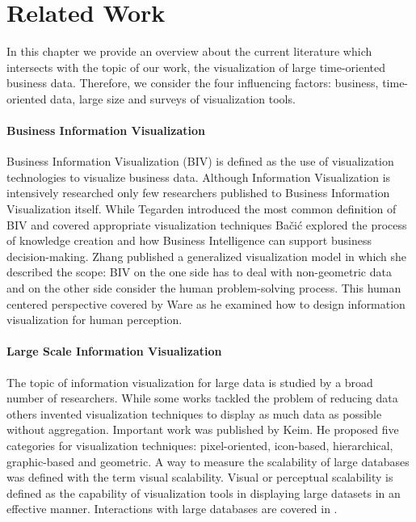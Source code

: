 \chapter{Related Work}
\label{chap:related Work}
In this chapter we provide an overview about the current literature which intersects with the topic of our work, the visualization of large time-oriented business data. Therefore, we consider the four influencing factors: business, time-oriented data, large size and surveys of visualization tools. 

\subsubsection*{Business Information Visualization} 
Business Information Visualization (BIV) is defined as the use of visualization technologies to visualize business data\cite{Tegarden1999}. Although Information Visualization is intensively researched\cite{Shneiderman2008,Shneiderman2002,Shneiderman1996,Keim2002} only few researchers published to Business Information Visualization itself. While Tegarden\cite{Tegarden1999} introduced the most common definition of BIV and covered appropriate visualization techniques Bačić explored the process of knowledge creation\cite{Bacic2012} and how Business Intelligence can support business decision-making\cite{Bacic,Bacic2012}. Zhang\cite{Zhang,Zhang1998,Zhang2001} published a generalized visualization model in which she described the scope: BIV on the one side has to deal with non-geometric data and on the other side consider the human problem-solving process. This human centered perspective covered by Ware\cite{Ware2012a} as he examined how to design information visualization for human perception.

\subsubsection*{Large Scale Information Visualization}
The topic of information visualization for large data is studied by a broad number of researchers. While some works tackled the problem of reducing data others invented visualization techniques to display as much data as possible without aggregation\cite{Krzywinski2009,Luo2012,Fekete2002}. Important work was published by Keim\cite{Keim1996}. He proposed five categories for visualization techniques: pixel-oriented\cite{Keim1995,Stein2013,Keim2000,keim1996pixel,Keim2001, Keim2005,Keim2008VisualChallenges}, icon-based\cite{Chung2014,Borgo2013,Fanea2005}, hierarchical\cite{Yang2003,Shneiderman1992,LeBlanc1990}, graphic-based and geometric\cite{Noirhomme-Fraiture2002}.
A way to measure the scalability of large databases was defined with the term visual scalability. Visual or perceptual scalability is defined as the capability of visualization tools in displaying large datasets in an effective manner\cite{Eick2002}.
Interactions with large databases are covered in \cite{Fisher2012,Buono,Jerding1998,mackinlay1991perspective,Keim2005}. 

